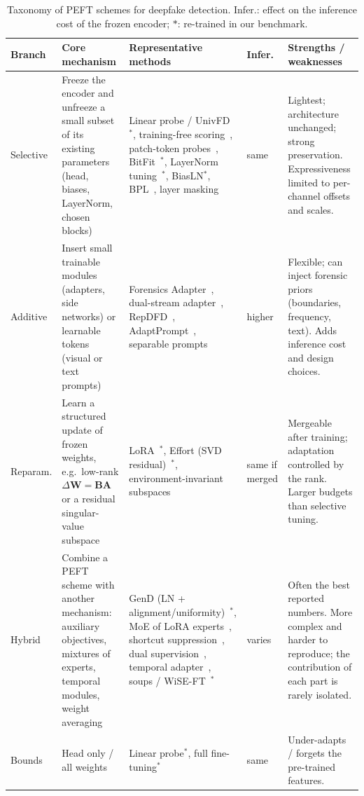 \documentclass[fonts]{icst}
\begin{document}
\begin{table}[!t]
\centering
\caption{Taxonomy of PEFT schemes for deepfake detection. Infer.: effect on the inference cost of the frozen encoder; $\ast$: re-trained in our benchmark.}
\label{tab:taxonomy}
\footnotesize
\begin{tabular}{p{} p{} p{} p{} p{}}
\toprule
\textbf{Branch} & \textbf{Core mechanism} & \textbf{Representative methods} & \textbf{Infer.} & \textbf{Strengths / weaknesses} \\
\midrule
Selective & Freeze the encoder and unfreeze a small subset of its existing parameters (head, biases, LayerNorm, chosen blocks) & Linear probe / UnivFD~\cite{ojha2023universal}$^\ast$, training-free scoring~\cite{tsai2024trainingfree}, patch-token probes~\cite{abdullah2026tap}, BitFit~\cite{benzaken2022bitfit}$^\ast$, LayerNorm tuning~\cite{yermakov2025clip}$^\ast$, BiasLN$^\ast$, BPL~\cite{xu2026bpl}, layer masking~\cite{zhang2026layermask} & same & Lightest; architecture unchanged; strong preservation. Expressiveness limited to per-channel offsets and scales. \\
Additive & Insert small trainable modules (adapters, side networks) or learnable tokens (visual or text prompts) & Forensics Adapter~\cite{cui2025forada}, dual-stream adapter~\cite{liao2026dfa}, RepDFD~\cite{lin2025repdfd}, AdaptPrompt~\cite{jiang2026adaptprompt}, separable prompts~\cite{yang2026separable} & higher & Flexible; can inject forensic priors (boundaries, frequency, text). Adds inference cost and design choices. \\
Reparam. & Learn a structured update of frozen weights, e.g.\ low-rank $\Delta\mathbf{W}=\mathbf{B}\mathbf{A}$ or a residual singular-value subspace & LoRA~\cite{hu2022lora}$^\ast$, Effort (SVD residual)~\cite{yan2025effort}$^\ast$, environment-invariant subspaces~\cite{chen2026envsubspace} & same if merged & Mergeable after training; adaptation controlled by the rank. Larger budgets than selective tuning. \\
Hybrid & Combine a PEFT scheme with another mechanism: auxiliary objectives, mixtures of experts, temporal modules, weight averaging & GenD (LN + alignment/uniformity)~\cite{yermakov2025gend}$^\ast$, MoE of LoRA experts~\cite{liu2024mole}, shortcut suppression~\cite{wang2026shortcut}, dual supervision~\cite{zhang2026dino}, temporal adapter~\cite{han2024fcg}, soups / WiSE-FT~\cite{wortsman2022soups,wortsman2022wiseft}$^\ast$ & varies & Often the best reported numbers. More complex and harder to reproduce; the contribution of each part is rarely isolated. \\
\midrule
Bounds & Head only / all weights & Linear probe$^\ast$, full fine-tuning$^\ast$ & same & Under-adapts / forgets the pre-trained features. \\
\bottomrule
\end{tabular}
\end{table}
\end{document}
